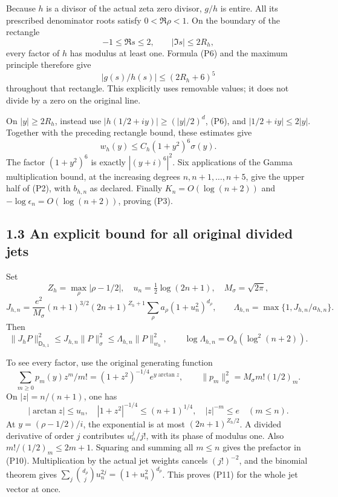 \documentclass[11pt]{article}
\begin{document}
Because \(h\) is a divisor of the actual zeta zero divisor, \(g/h\) is entire. All its prescribed denominator roots satisfy \(0<\Re\rho<1\). On the boundary of the rectangle \[
 -1\le\Re s\le2,\qquad |\Im s|\le2R_h,
\] every factor of \(h\) has modulus at least one. Formula (P6) and the maximum principle therefore give \[
 |g(s)/h(s)|\le(2R_h+6)^5
\] throughout that rectangle. This explicitly uses removable values; it does not divide by a zero on the original line.

On \(|y|\ge2R_h\), instead use \(|h(1/2+iy)|\ge(|y|/2)^d\), (P6), and \(|1/2+iy|\le2|y|\). Together with the preceding rectangle bound, these estimates give \[
 w_h(y)\le C_h(1+y^2)^6\sigma(y). \tag{P9}
\] The factor \((1+y^2)^6\) is exactly \(|(y+i)^6|^2\). Six applications of the Gamma multiplication bound, at the increasing degrees \(n,n+1,\ldots,n+5\), give the upper half of (P2), with \(b_{h,n}\) as declared. Finally \(K_n=O(\log(n+2))\) and \(-\log\epsilon_n=O(\log(n+2))\), proving (P3).

\subsection{1.3 An explicit bound for all original divided jets}\label{an-explicit-bound-for-all-original-divided-jets}

Set \[
 Z_h=\max_\rho|\rho-1/2|,\quad
 u_n=\tfrac12\log(2n+1),\quad M_\sigma=\sqrt{2\pi},
\] \[
 J_{h,n}=
 \frac{e^2}{M_\sigma}(n+1)^{3/2}(2n+1)^{Z_h+1}
 \sum_\rho a_\rho(1+u_n^2)^{d_\rho},\qquad
 \Lambda_{h,n}=\max\{1,J_{h,n}/a_{h,n}\}. \tag{P10}
\] Then \[
\boxed{
 \|J_hP\|_{\mathsf D_{h,1}}^2\le J_{h,n}\|P\|_\sigma^2
 \le\Lambda_{h,n}\|P\|_{w_h}^2,\qquad
 \log\Lambda_{h,n}=O_h(\log^2(n+2)).
} \tag{P11}
\]

To see every factor, use the original generating function \[
 \sum_{m\ge0}p_m(y)z^m/m!=(1+z^2)^{-1/4}e^{y\arctan z},
 \qquad \|p_m\|_\sigma^2=M_\sigma m!(1/2)_m.
\] On \(|z|=n/(n+1)\), one has \[
 |\arctan z|\le u_n,\quad
 |1+z^2|^{-1/4}\le(n+1)^{1/4},\quad |z|^{-m}\le e
 \quad(m\le n).
\] At \(y=(\rho-1/2)/i\), the exponential is at most \((2n+1)^{Z_h/2}\). A divided derivative of order \(j\) contributes \(u_n^j/j!\), with its phase of modulus one. Also \(m!/(1/2)_m\le2m+1\). Squaring and summing all \(m\le n\) gives the prefactor in (P10). Multiplication by the actual jet weights cancels \((j!)^{-2}\), and the binomial theorem gives \(\sum_j\binom{d_\rho}{j}u_n^{2j}=(1+u_n^2)^{d_\rho}\). This proves (P11) for the whole jet vector at once.
\end{document}
